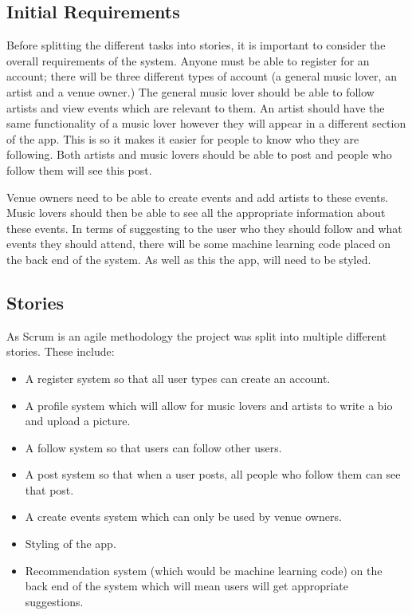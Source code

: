 \subsection{Initial Requirements}
Before splitting the different tasks into stories, it is important to consider the overall requirements of the system. Anyone must be able to register for an account; there will be three different types of account (a general music lover, an artist and a venue owner.) The general music lover should be able to follow artists and view events which are relevant to them. An artist should have the same functionality of a music lover however they will appear in a different section of the app. This is so it makes it easier for people to know who they are following. Both artists and music lovers should be able to post and people who follow them will see this post.

Venue owners need to be able to create events and add artists to these events. Music lovers should then be able to see all the appropriate information about these events. In terms of suggesting to the user who they should follow and what events they should attend, there will be some machine learning code placed on the back end of the system. As well as this the app, will need to be styled.

\subsection{Stories}
As Scrum is an agile methodology the project was split into multiple different stories. These include:
\begin{itemize}
	\item A register system so that all user types can create an account.
	\item A profile system which will allow for music lovers and artists to write a bio and upload a picture.
	\item A follow system so that users can follow other users.
	\item A post system so that when a user posts, all people who follow them can see that post.
	\item A create events system which can only be used by venue owners.
	\item Styling of the app.
	\item Recommendation system (which would be machine learning code) on the back end of the system which will mean users will get appropriate suggestions.
\end{itemize}

